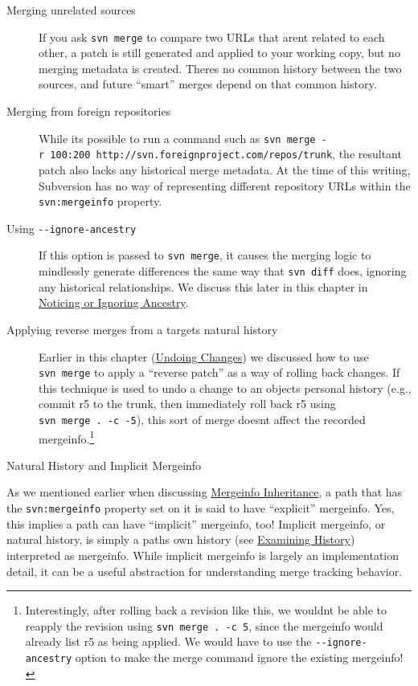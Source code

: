 \begin{description}
\item[Merging unrelated sources]
If you ask \texttt{svn\ merge} to compare two URLs that
aren\textquotesingle t related to each other, a patch is still generated
and applied to your working copy, but no merging metadata is created.
There\textquotesingle s no common history between the two sources, and
future ``smart'' merges depend on that common history.
\item[Merging from foreign repositories]
While it\textquotesingle s possible to run a command such as
\texttt{svn\ merge\ -r\ 100:200\ http://svn.foreignproject.com/repos/trunk},
the resultant patch also lacks any historical merge metadata. At the
time of this writing, Subversion has no way of representing different
repository URLs within the \texttt{svn:mergeinfo} property.
\item[Using \texttt{-\/-ignore-ancestry}]
If this option is passed to \texttt{svn\ merge}, it causes the merging
logic to mindlessly generate differences the same way that
\texttt{svn\ diff} does, ignoring any historical relationships. We
discuss this later in this chapter in
\hyperref[svn.branchmerge.advanced.ancestry]{Noticing or Ignoring
Ancestry}.
\item[Applying reverse merges from a target\textquotesingle s natural
history]
Earlier in this chapter
(\hyperref[svn.branchmerge.basicmerging.undo]{Undoing Changes}) we
discussed how to use \texttt{svn\ merge} to apply a ``reverse patch'' as
a way of rolling back changes. If this technique is used to undo a
change to an object\textquotesingle s personal history (e.g., commit r5
to the trunk, then immediately roll back r5 using
\texttt{svn\ merge\ .\ -c\ -5}), this sort of merge
doesn\textquotesingle t affect the recorded mergeinfo.\footnote{Interestingly,
  after rolling back a revision like this, we wouldn\textquotesingle t
  be able to reapply the revision using \texttt{svn\ merge\ .\ -c\ 5},
  since the mergeinfo would already list r5 as being applied. We would
  have to use the \texttt{-\/-ignore-ancestry} option to make the merge
  command ignore the existing mergeinfo!}
\end{description}

\protect{}\label{svn.branchmerge.nomergedata.impicit.mergeinfo}
Natural History and Implicit Mergeinfo

As we mentioned earlier when discussing
\hyperref[svn.branchmerge.basicmerging.mergeinfo.inheritance]{Mergeinfo
Inheritance}, a path that has the \texttt{svn:mergeinfo} property set on
it is said to have ``explicit'' mergeinfo. Yes, this implies a path can
have ``implicit'' mergeinfo, too! Implicit mergeinfo, or natural
history, is simply a path\textquotesingle s own history (see
\hyperref[svn.tour.history]{Examining History}) interpreted as
mergeinfo. While implicit mergeinfo is largely an implementation detail,
it can be a useful abstraction for understanding merge tracking
behavior.

